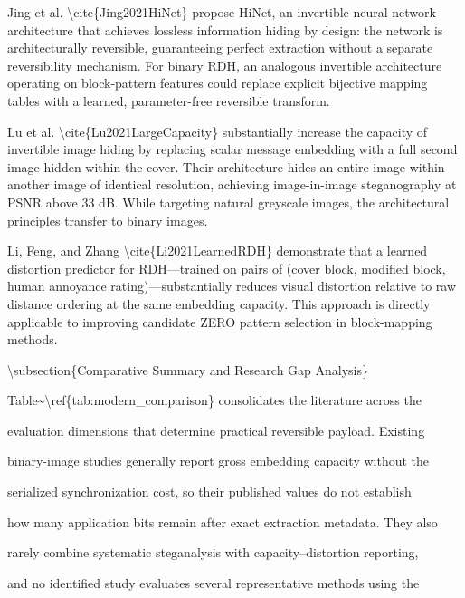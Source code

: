 \documentclass[a4paper,fleqn]{cas-dc}
\newenvironment{RevisionDeletion}{%
  \par\begingroup\color{revisionred}\footnotesize\ttfamily
  \setlength{\parindent}{0pt}\setlength{\parskip}{1pt}\obeyspaces
}{\par\endgroup}
\begin{document}
\begin{RevisionDeletion}
\par
Jing et al. \textbackslash{}cite\{Jing2021HiNet\} propose HiNet, an invertible neural network architecture that achieves lossless information hiding by design: the network is architecturally reversible, guaranteeing perfect extraction without a separate reversibility mechanism. For binary RDH, an analogous invertible architecture operating on block-pattern features could replace explicit bijective mapping tables with a learned, parameter-free reversible transform.\par
\par
Lu et al. \textbackslash{}cite\{Lu2021LargeCapacity\} substantially increase the capacity of invertible image hiding by replacing scalar message embedding with a full second image hidden within the cover. Their architecture hides an entire image within another image of identical resolution, achieving image-in-image steganography at PSNR above 33 dB. While targeting natural greyscale images, the architectural principles transfer to binary images.\par
\par
Li, Feng, and Zhang \textbackslash{}cite\{Li2021LearnedRDH\} demonstrate that a learned distortion predictor for RDH---trained on pairs of (cover block, modified block, human annoyance rating)---substantially reduces visual distortion relative to raw distance ordering at the same embedding capacity. This approach is directly applicable to improving candidate ZERO pattern selection in block-mapping methods.\par
\par
\textbackslash{}subsection\{Comparative Summary and Research Gap Analysis\}\par
\par
Table\textasciitilde{}\textbackslash{}ref\{tab:modern\_comparison\} consolidates the literature across the\par
evaluation dimensions that determine practical reversible payload. Existing\par
binary-image studies generally report gross embedding capacity without the\par
serialized synchronization cost, so their published values do not establish\par
how many application bits remain after exact extraction metadata. They also\par
rarely combine systematic steganalysis with capacity--distortion reporting,\par
and no identified study evaluates several representative methods using the\par

\end{RevisionDeletion}
\end{document}
